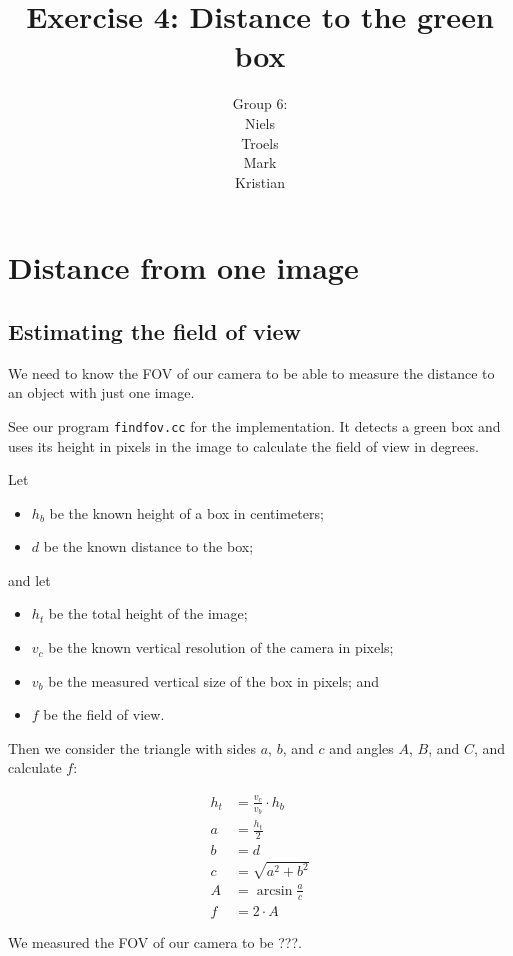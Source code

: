 \documentclass[a4paper,12pt]{article}
\title{Exercise 4: Distance to the green box}
\author{Group 6:\\Niels\\Troels\\Mark\\Kristian}
\begin{document}
\maketitle

\section{Distance from one image}

\subsection{Estimating the field of view}

We need to know the FOV of our camera to be able to measure the distance to an
object with just one image.

See our program \texttt{findfov.cc} for the implementation.  It detects a green
box and uses its height in pixels in the image to calculate the field of view in
degrees.

Let
\begin{itemize}
\item $h_b$ be the known height of a box in centimeters;
\item $d$ be the known distance to the box;
\end{itemize}

and let
\begin{itemize}
\item $h_t$ be the total height of the image;
\item $v_c$ be the known vertical resolution of the camera in pixels;
\item $v_b$ be the measured vertical size of the box in pixels; and
\item $f$ be the field of view.
\end{itemize}

Then we consider the triangle with sides $a$, $b$, and $c$ and angles $A$, $B$,
and $C$, and calculate $f$:

\begin{align*}
  h_t &= \frac{v_c}{v_b} \cdot h_b\\
  a &= \frac{h_t}{2}\\
  b &= d\\
  c &= \sqrt{a^2 + b^2}\\
  A &= \arcsin \frac{a}{c}\\
  f &= 2 \cdot A
\end{align*}

We measured the FOV of our camera to be ???.
\end{document}
